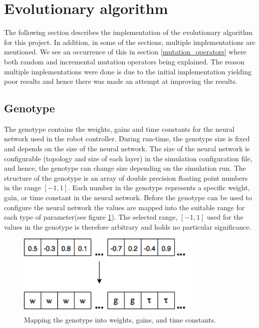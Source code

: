 			
\section{Evolutionary algorithm}
The following section describes the implementation of the evolutionary algorithm for this project.
In addition, in some of the sections, multiple implementations are mentioned.
We see an occurrence of this in section \ref{mutation_operators} where both random and incremental mutation operators being explained.
The reason multiple implementations were done is due to the initial implementation yielding poor results and hence there was made an attempt at improving the results.

\subsection{Genotype}
\label{sec:genotype}
The genotype contains the weights, gains and time constants for the neural network used in the robot controller.
During run-time, the genotype size is fixed and depends on the size of the neural network.
The size of the neural network is configurable (topology and size of each layer) in the simulation configuration file, and hence, the genotype can change size depending on the simulation run.
The structure of the genotype is an array of double precision floating point numbers in the range $[-1, 1]$.
Each number in the genotype represents a specific weight, gain, or time constant in the neural network.
Before the genotype can be used to configure the neural network the values are mapped into the suitable range for each type of parameter(see figure \ref{fig:genotype-mapping}).
The selected range, $[-1, 1]$ used for the values in the genotype is therefore arbitrary and holds no particular significance. 

\begin{figure}[H]        
	\centering
	\includegraphics[width=0.80\textwidth, clip]{chapters/res/genotype_translation.png}
	\caption{Mapping the genotype into weights, gains, and time constants.}
	\label{fig:genotype-mapping}
\end{figure}

